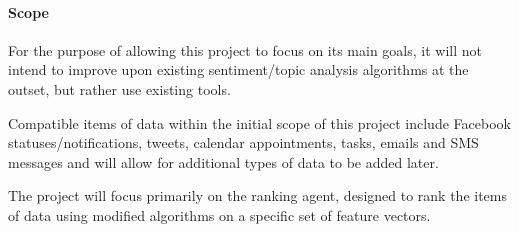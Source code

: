 \paragraph{Scope}
For the purpose of allowing this project to focus on its main goals, it will not intend to improve upon existing sentiment/topic analysis algorithms at the outset, but rather use existing tools. 

Compatible items of data within the initial scope of this project include Facebook statuses/notifications, tweets, calendar appointments, tasks, emails and SMS messages and will allow for additional types of data to be added later.

The project will focus primarily on the ranking agent, designed to rank the items of data using modified algorithms on a specific set of feature vectors.
